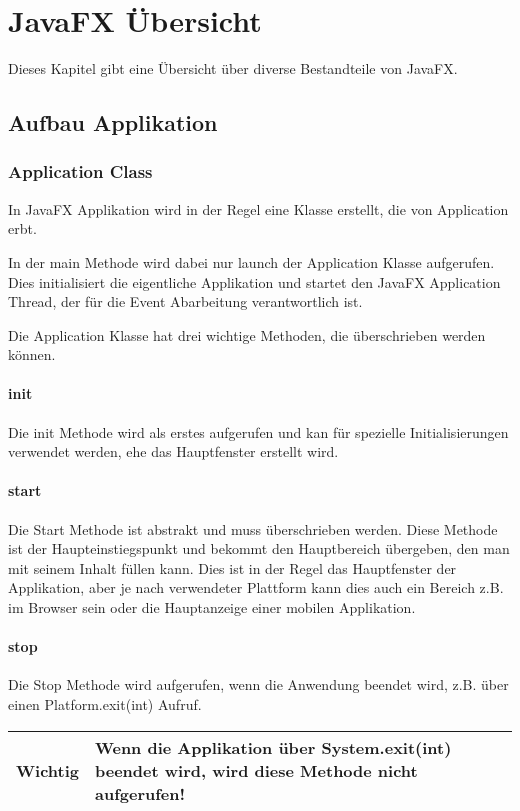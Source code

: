 \section{JavaFX Übersicht}
Dieses Kapitel gibt eine Übersicht über diverse Bestandteile von JavaFX.

\subsection{Aufbau Applikation}

\subsubsection{Application Class}
In JavaFX Applikation wird in der Regel eine Klasse erstellt, die von Application erbt.

In der main Methode wird dabei nur launch der Application Klasse aufgerufen. Dies initialisiert
die eigentliche Applikation und startet den JavaFX Application Thread, der für die Event
Abarbeitung verantwortlich ist.

Die Application Klasse hat drei wichtige Methoden, die überschrieben werden können.
\paragraph{init}
Die init Methode wird als erstes aufgerufen und kan für spezielle Initialisierungen
verwendet werden, ehe das Hauptfenster erstellt wird.

\paragraph{start}
Die Start Methode ist abstrakt und muss überschrieben werden. Diese Methode ist der
Haupteinstiegspunkt und bekommt den Hauptbereich übergeben, den man mit seinem Inhalt
füllen kann. Dies ist in der Regel das Hauptfenster der Applikation, aber je nach
verwendeter Plattform kann dies auch ein Bereich z.B. im Browser sein oder die Hauptanzeige
einer mobilen Applikation.

\paragraph{stop}
Die Stop Methode wird aufgerufen, wenn die Anwendung beendet wird, z.B. über einen
Platform.exit(int) Aufruf.

\begin{tabular}[h]{|p{2cm}|p{9cm}|}
\hline
\textbf{Wichtig} & Wenn die Applikation über System.exit(int) beendet wird, wird diese
Methode nicht aufgerufen! \\
\hline
\end{tabular}

